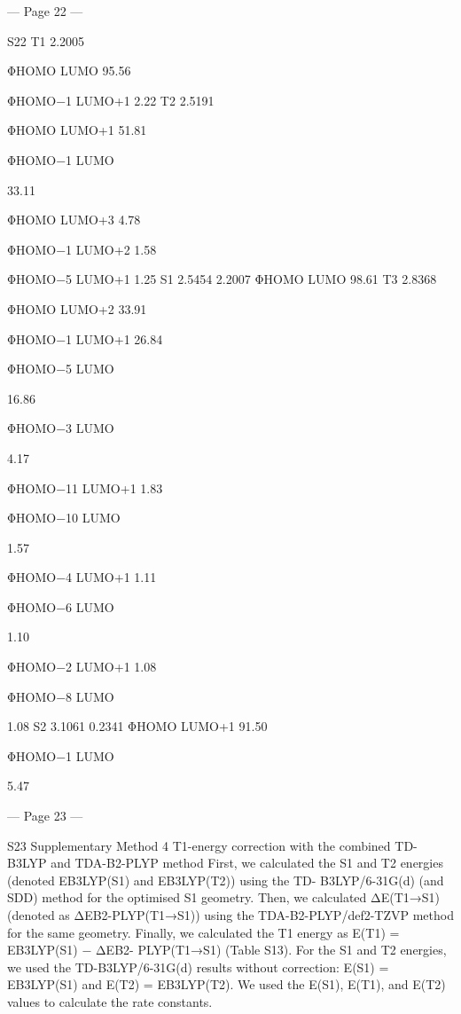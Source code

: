 --- Page 22 ---
 
S22 
T1 
2.2005 
 
ΦHOMO
LUMO       
95.56 
 
 
 
ΦHOMO−1
LUMO+1 
2.22 
T2 
2.5191 
 
ΦHOMO
LUMO+1 
51.81 
 
 
 
ΦHOMO−1
LUMO
 
33.11 
 
 
 
ΦHOMO
LUMO+3 
4.78 
 
 
 
ΦHOMO−1
LUMO+2 
1.58 
 
 
 
ΦHOMO−5
LUMO+1 
1.25 
S1 
2.5454 
2.2007 
ΦHOMO
LUMO 
98.61 
T3 
2.8368 
 
ΦHOMO
LUMO+2 
33.91 
 
 
 
ΦHOMO−1
LUMO+1 
26.84 
 
 
 
ΦHOMO−5
LUMO
 
16.86 
 
 
 
ΦHOMO−3
LUMO
 
4.17 
 
 
 
ΦHOMO−11
LUMO+1  
1.83 
 
 
 
ΦHOMO−10
LUMO
 
1.57 
 
 
 
ΦHOMO−4
LUMO+1 
1.11 
 
 
 
ΦHOMO−6
LUMO
 
1.10 
 
 
 
ΦHOMO−2
LUMO+1 
1.08 
 
 
 
ΦHOMO−8
LUMO
 
1.08 
S2 
3.1061 
0.2341 
ΦHOMO
LUMO+1 
91.50 
 
 
 
ΦHOMO−1
LUMO
 
5.47 
 
 
 
 
 


--- Page 23 ---
 
S23 
Supplementary Method 4 
T1-energy correction with the combined TD-B3LYP and TDA-B2-PLYP method 
First, we calculated the S1 and T2 energies (denoted EB3LYP(S1) and EB3LYP(T2)) using the TD-
B3LYP/6-31G(d) (and SDD) method for the optimised S1 geometry. Then, we calculated 
ΔE(T1→S1) (denoted as ΔEB2-PLYP(T1→S1)) using the TDA-B2-PLYP/def2-TZVP method for 
the same geometry. Finally, we calculated the T1 energy as E(T1) = EB3LYP(S1) − ΔEB2-
PLYP(T1→S1) (Table S13). For the S1 and T2 energies, we used the TD-B3LYP/6-31G(d) 
results without correction: E(S1) = EB3LYP(S1) and E(T2) = EB3LYP(T2). We used the E(S1), 
E(T1), and E(T2) values to calculate the rate constants. 
 
